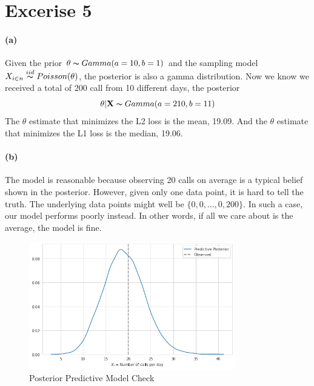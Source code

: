 \documentclass[11pt, letterpaper]{article}
\begin{document}
\section{Excerise 5}
\paragraph{(a)}
Given the prior $\theta \thicksim Gamma(a=10, b=1)$ and the sampling model
$X_{i \in n} \overset{iid}{\thicksim} Poisson(\theta)$, the posterior is also a gamma distribution.
Now we know we received a total of 200 call from 10 different days, the posterior
\[ \theta|\mathbf{X} \thicksim Gamma(a=210, b=11) \]
The $\theta$ estimate that minimizes the L2 loss is the mean, 19.09. And the $\theta$ estimate
that minimizes the L1 loss is the median, 19.06.

\paragraph{(b)}
The model is reasonable because observing 20 calls on average is a typical belief shown in the posterior.
However, given only one data point, it is hard to tell the truth. The underlying data points might well be
$\{0, 0, \dots, 0, 200\}$. In such a case, our model performs poorly instead. In other words, if all we
care about is the average, the model is fine.

\begin{figure}[!h]
  \centering
  \includegraphics[width=0.8\textwidth]{5.b.png}
  \captionsetup{justification=centering}
  \caption{Posterior Predictive Model Check}
\end{figure}
\newpage
\end{document}
